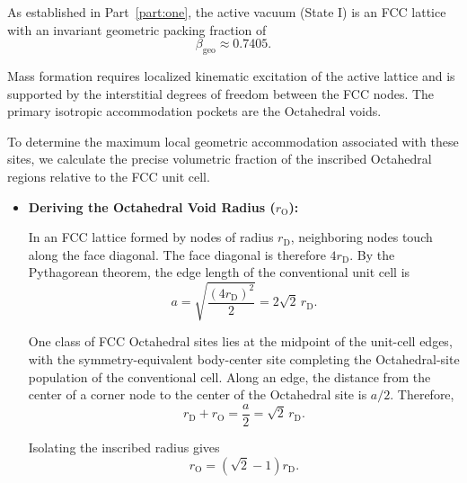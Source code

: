As established in Part~\ref{part:one}, the active vacuum (State I) is an FCC lattice with
an invariant geometric packing fraction of
\begin{equation}
    \beta_{\mathrm{geo}}
    \approx
    0.7405.
\end{equation}

Mass formation requires localized kinematic excitation of the active lattice
and is supported by the interstitial degrees of freedom between the FCC
nodes. The primary isotropic accommodation pockets are the Octahedral voids.

To determine the maximum local geometric accommodation associated with these
sites, we calculate the precise volumetric fraction of the inscribed
Octahedral regions relative to the FCC unit cell.

\begin{itemize}

    \item \textbf{Deriving the Octahedral Void Radius
    (\(r_{\mathrm O}\)):}

    In an FCC lattice formed by nodes of radius \(r_{\mathrm D}\), neighboring
    nodes touch along the face diagonal. The face diagonal is therefore
    \(4r_{\mathrm D}\). By the Pythagorean theorem, the edge length of the
    conventional unit cell is
    \begin{equation}
        a
        =
        \sqrt{
            \frac{
                (4r_{\mathrm D})^2
            }{
                2
            }
        }
        =
        2\sqrt{2}\,r_{\mathrm D}.
    \end{equation}

    One class of FCC Octahedral sites lies at the midpoint of the unit-cell
    edges, with the symmetry-equivalent body-center site completing the
    Octahedral-site population of the conventional cell. Along an edge, the
    distance from the center of a corner node to the center of the Octahedral
    site is \(a/2\). Therefore,
    \begin{equation}
        r_{\mathrm D}
        +
        r_{\mathrm O}
        =
        \frac{a}{2}
        =
        \sqrt{2}\,r_{\mathrm D}.
    \end{equation}

    Isolating the inscribed radius gives
    \begin{equation}
        r_{\mathrm O}
        =
        (\sqrt{2}-1)
        r_{\mathrm D}.
    \end{equation}


\end{itemize}
